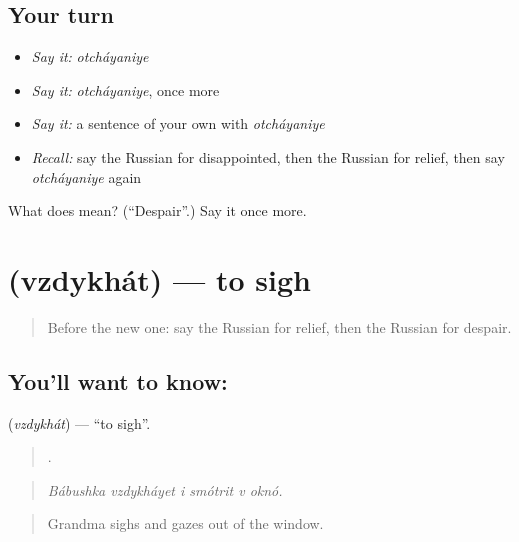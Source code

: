 \subsection*{Your turn}
\begin{itemize}
\raggedright
  \item \emph{Say it:} \emph{otcháyaniye}
  \item \emph{Say it:} \emph{otcháyaniye}, once more
  \item \emph{Say it:} a sentence of your own with \emph{otcháyaniye}
  \item \emph{Recall:} say the Russian for disappointed, then the Russian for relief, then say \emph{otcháyaniye} again
\end{itemize}

\begin{tcolorbox}[breakable,colback=teal!4,colframe=teal!35!black,title={Before you move on}]
What does  mean? (\textquotedblleft{}Despair\textquotedblright{}.) Say it once more.
\end{tcolorbox}
\section[\texorpdfstring{\ru{вздыхать} (vzdykhát)}{вздыхать (vzdykhát)}]{ (vzdykhát) — to sigh}

\label{lesson:RU-C473-vzdykhat}



\begin{quote}
Before the new one: say the Russian for relief, then the Russian for despair.
\end{quote}

\subsection*{You'll want to know: }
\textbf{} (\emph{vzdykhát}) — \textquotedblleft{}to sigh\textquotedblright{}.

\begin{quote}
     .
\end{quote}

\begin{quote}
\emph{Bábushka vzdykháyet i smótrit v oknó.}
\end{quote}

\begin{quote}
Grandma sighs and gazes out of the window.
\end{quote}

